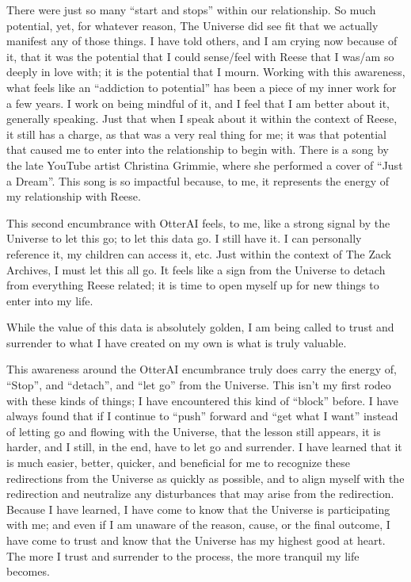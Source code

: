 \documentclass{article}
\begin{document}
There were just so many ``start and stops'' within our relationship. So
much potential, yet, for whatever reason, The Universe did see fit that
we actually manifest any of those things. I have told others, and I am
crying now because of it, that it was the potential that I could
sense/feel with Reese that I was/am so deeply in love with; it is the
potential that I mourn. Working with this awareness, what feels like an
``addiction to potential'' has been a piece of my inner work for a few
years. I work on being mindful of it, and I feel that I am better about
it, generally speaking. Just that when I speak about it within the
context of Reese, it still has a charge, as that was a very real thing
for me; it was that potential that caused me to enter into the
relationship to begin with. There is a song by the late YouTube artist
Christina Grimmie, where she performed a cover of ``Just a Dream''. This
song is so impactful because, to me, it represents the energy of my
relationship with Reese.

This second encumbrance with OtterAI feels, to me, like a strong signal
by the Universe to let this go; to let this data go. I still have it. I
can personally reference it, my children can access it, etc. Just within
the context of The Zack Archives, I must let this all go. It feels like
a sign from the Universe to detach from everything Reese related; it is
time to open myself up for new things to enter into my life.

While the value of this data is absolutely golden, I am being called to
trust and surrender to what I have created on my own is what is truly
valuable.

This awareness around the OtterAI encumbrance truly does carry the
energy of, ``Stop'', and ``detach'', and ``let go'' from the Universe.
This isn't my first rodeo with these kinds of things; I have encountered
this kind of ``block'' before. I have always found that if I continue to
``push'' forward and ``get what I want'' instead of letting go and
flowing with the Universe, that the lesson still appears, it is harder,
and I still, in the end, have to let go and surrender. I have learned
that it is much easier, better, quicker, and beneficial for me to
recognize these redirections from the Universe as quickly as possible,
and to align myself with the redirection and neutralize any disturbances
that may arise from the redirection. Because I have learned, I have come
to know that the Universe is participating with me; and even if I am
unaware of the reason, cause, or the final outcome, I have come to trust
and know that the Universe has my highest good at heart. The more I
trust and surrender to the process, the more tranquil my life becomes.
\end{document}
